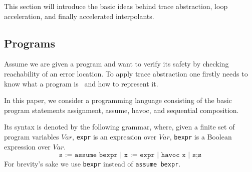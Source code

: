\documentclass{article}
\newcommand{\Var}{\ensuremath{\mathit{Var}}\xspace}
\newcommand\mycom[1]{}
\newcommand\mycom[1]{#1}
\newcommand{\dd}[1]{\mycom{\todo[color=orange!40,inline]{\small DD: #1}}}
\begin{document}
This section will introduce the basic ideas behind trace abstraction, loop acceleration, and finally accelerated interpolants.

\subsection{Programs}
Assume we are given a program and want to verify its safety by checking reachability of an error location. 
To apply trace abstraction one firstly needs to know what a program is~\cite{DBLP:journals/corr/GreitschusDP17} and how to represent it.

In this paper, we consider a programming language consisting of the basic program statements assignment, assume, havoc, and sequential composition.
\dd{What about havoc?}
Its syntax is denoted by the following grammar, where, given a finite set of program variables \Var, \texttt{expr} is an expression over \Var, \texttt{bexpr} is a Boolean expression over \Var.
\begin{equation*}
    \texttt{s := assume bexpr | x := expr | havoc x | s;s}
\end{equation*}
For brevity's sake we use \texttt{bexpr} instead of \texttt{assume bexpr}.
\end{document}
